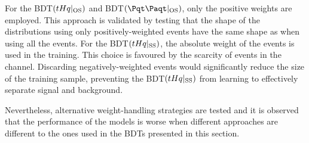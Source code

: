 For the BDT$(tHq|_{\text{OS}})$ and BDT$(\ttbar|_{\text{OS}})$, only the positive weights
are employed. This approach is validated by testing that the shape of the distributions
using only positively-weighted events have the same shape as when using all the events.
For the BDT$(tHq|_{\text{SS}})$, the absolute weight of the events is used in the training. 
This choice is favoured by the scarcity of events in the \dilepSStau channel. 
Discarding negatively-weighted events would significantly reduce the size of the training sample, 
preventing the BDT$(tHq|_{\text{SS}})$ from learning to effectively separate signal and background.


\begin{comment}
\begin{table}[h]
\centering
\begin{tabular}{l|cc|cc}
\cline{2-5}
         				& \multicolumn{2}{c}{All weights} & \multicolumn{2}{c}{Positive weights} \\
         				& All           & Target          & All             & Target             \\ \midrule
BDT$(\tHq|_{\text{OS}})$  &               &                 &                 &                    \\
BDT$(\ttbar|_{\text{OS}})$ &               &                 &                 &                    \\
BDT$(\tHq|_{\text{SS}})$   &               &                 &                 &                   \\ \bottomrule
\end{tabular}
\caption{Raw events entering the training of the BDTs depending on whether all the events are just or only those yielding positive weights. The raw yields are presented for the complete training sample and for the target process only.}
\label{tab:ChaptH:EventSelection:BDT:RawYields}
\end{table}
\end{comment}

Nevertheless, alternative weight-handling strategies are tested and
it is observed that
the performance of the models is worse when different approaches are 
different to the ones used in the BDTs presented in this section.






